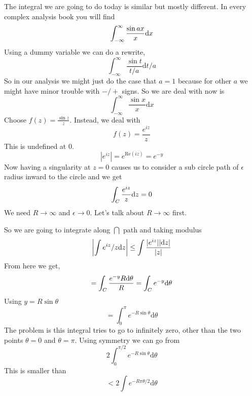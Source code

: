 \documentclass[letter]{article}
\title{}
\author{Ahmed Saad Sabit, Rice University}
\date{\today}
\begin{document}
\maketitle
The integral we are going to do today is similar but mostly different. 
In every complex analysis book you will find
\[
	\int_{-\infty}^{\infty} {\sin ax \over x } \mathrm{d} x
\]
Using a dummy variable we can do a rewrite,
\[
	\int_{-\infty}^{\infty} \frac{\sin t}{t / a} \mathrm{d} t / a
\]
So in our analysis we might just do the case that $a= 1$ because for other $a$ we might have minor trouble with $-/+$ signs. So we are deal with now is
\[
\boxed{
	\int_{-\infty}^{\infty} \frac{\sin x}{x} \mathrm{d} x
}
\] 
Choose $f(z) = \frac{\sin z}{z}$. Instead, we deal with 
\[
f(z) = \frac{e^{iz}}{z}
\] This is undefined at $0$. 
\[
| e^{iz} | = e^{\text{Re}(iz)} = e^{-y}
\] 
Now having a singularity at $z=0$ causes us to consider a sub circle path of $\epsilon$ radius inward to the circle and we get
\[
\int_C {e^{iz} \over z} \mathrm{d} z = 0
\] We need $R \to \infty$ and $\epsilon \to  0$. Let's talk about $R\to \infty$ first. 

So we are going to integrate along $\bigcap $ path and taking modulus
\[
\left| \int e^{iz}/z \mathrm{d} z \right| \le \int 
{ |e^{iz}| | \mathrm{d} z| \over |z| } 
\]
From here we get, 
\[
= \int_C 
{ e^{-y} R \mathrm{d} \theta \over R} = \int_C e^{-y} \mathrm{d} \theta
\]
Using $y = R \sin \theta$ 
\[
= \int_0 ^\pi e^{-R \sin \theta} \mathrm{d} \theta
\] The problem is this integral tries to go to infinitely zero, other than the two points $\theta = 0$ and $\theta = \pi $. Using symmetry we can go from 
\[
2 \int_0^{\pi / 2} e^{-R \sin \theta} \mathrm{d}  \theta 
\]
This is smaller than 
\[
< 2 \int e^{ - R \pi \theta / 2} \mathrm{d}  \theta
\] 
\end{document}
